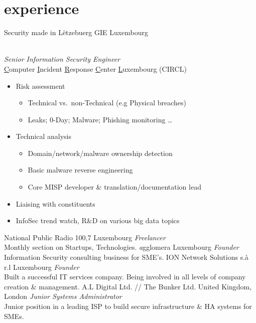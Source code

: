 \documentclass[a4paper]{friggeri-cv} %
\begin{document}
\section{experience}
\begin{entrylist}
{Security made in L\"{e}tzebuerg GIE}
{Luxembourg}
{\\
\emph{Senior Information Security Engineer} \\
\underline{C}omputer \underline{I}ncident \underline{R}esponse \underline{C}enter \underline{L}uxembourg (CIRCL)
\begin{itemize}
    \item Risk assessment
    \begin{itemize}
        \item Technical vs.\ non-Technical (e.g Physical breaches)
        \item Leaks; 0-Day; Malware; Phishing monitoring \ldots
    \end{itemize}
    \item Technical analysis
    \begin{itemize}
        \item Domain/network/malware ownership detection
        \item Basic malware reverse engineering
        \item Core MISP developer \& translation/documentation lead
    \end{itemize}
    \item Liaising with constituents
    \item InfoSec trend watch, R\&D on various big data topics
\end{itemize}
}
{National Public Radio 100,7}
{Luxembourg}
{\emph{Freelancer}\\
Monthly section on Startups, Technologies.}
{\emph{a}gglomera}
{Luxembourg}
{\emph{Founder}\\
Information Security consulting business for SME's.}
{ION Network Solutions s.\`{a} r.l}
{Luxembourg}
{\emph{Founder} \\
Built a successful IT services company. Being involved in all levels of company creation \& management.}
{A.L Digital Ltd. // The Bunker Ltd.}
{United Kingdom, London}
{\emph{Junior Systems Administrator} \\
Junior position in a leading ISP to build secure infrastructure \& HA systems for SMEs.}
\end{entrylist}
\end{document}
